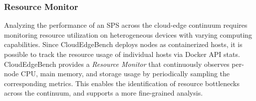 \documentclass[runningheads]{llncs}
\begin{document}








\subsubsection{Resource Monitor}
Analyzing the performance of an SPS across the cloud-edge continuum requires monitoring resource utilization on heterogeneous devices with varying computing capabilities.
Since CloudEdgeBench deploys nodes as containerized hosts, it is possible to track the resource usage of individual hosts via Docker API stats. %
CloudEdgeBench provides a \textit{Resource Monitor} that continuously observes per-node CPU, main memory, and storage usage by periodically sampling the corresponding metrics.
This enables the identification of resource bottlenecks across the continuum, and supports a more fine-grained analysis.
\end{document}
